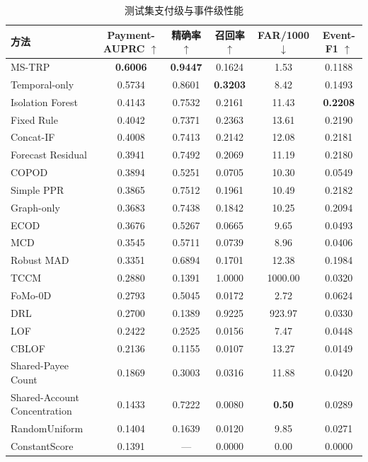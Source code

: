 \documentclass[twocolumn,11pt]{ctexart}
\begin{document}
\begin{table}[t]
\centering\small
\caption{测试集支付级与事件级性能}
\begin{tabular}{lccccc}
\toprule
方法 & Payment-AUPRC $\uparrow$ & 精确率 $\uparrow$ & 召回率 $\uparrow$ & FAR/1000 $\downarrow$ & Event-F1 $\uparrow$ \\
\midrule
MS-TRP & \textbf{0.6006} & \textbf{0.9447} & 0.1624 & 1.53 & 0.1188 \\
Temporal-only & 0.5734 & 0.8601 & \textbf{0.3203} & 8.42 & 0.1493 \\
Isolation Forest\cite{ref2} & 0.4143 & 0.7532 & 0.2161 & 11.43 & \textbf{0.2208} \\
Fixed Rule & 0.4042 & 0.7371 & 0.2363 & 13.61 & 0.2190 \\
Concat-IF\cite{ref2} & 0.4008 & 0.7413 & 0.2142 & 12.08 & 0.2181 \\
Forecast Residual & 0.3941 & 0.7492 & 0.2069 & 11.19 & 0.2180 \\
COPOD\cite{ref14} & 0.3894 & 0.5251 & 0.0705 & 10.30 & 0.0549 \\
Simple PPR\cite{ref29} & 0.3865 & 0.7512 & 0.1961 & 10.49 & 0.2182 \\
Graph-only & 0.3683 & 0.7438 & 0.1842 & 10.25 & 0.2094 \\
ECOD\cite{ref13} & 0.3676 & 0.5267 & 0.0665 & 9.65 & 0.0493 \\
MCD\cite{ref4} & 0.3545 & 0.5711 & 0.0739 & 8.96 & 0.0406 \\
Robust MAD & 0.3351 & 0.6894 & 0.1701 & 12.38 & 0.1984 \\
TCCM\cite{ref40} & 0.2880 & 0.1391 & 1.0000 & 1000.00 & 0.0320 \\
FoMo-0D\cite{ref39} & 0.2793 & 0.5045 & 0.0172 & 2.72 & 0.0624 \\
DRL\cite{ref38} & 0.2700 & 0.1389 & 0.9225 & 923.97 & 0.0330 \\
LOF\cite{ref3} & 0.2422 & 0.2525 & 0.0156 & 7.47 & 0.0448 \\
CBLOF\cite{ref5} & 0.2136 & 0.1155 & 0.0107 & 13.27 & 0.0149 \\
Shared-Payee Count & 0.1869 & 0.3003 & 0.0316 & 11.88 & 0.0420 \\
Shared-Account Concentration & 0.1433 & 0.7222 & 0.0080 & \textbf{0.50} & 0.0289 \\
RandomUniform & 0.1404 & 0.1639 & 0.0120 & 9.85 & 0.0271 \\
ConstantScore & 0.1391 & — & 0.0000 & 0.00 & 0.0000 \\
\bottomrule
\end{tabular}
\end{table}
\end{document}

